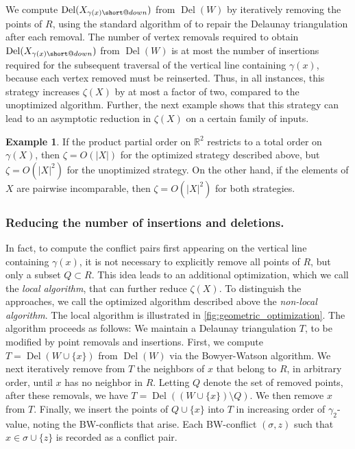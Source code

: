 \documentclass[11pt]{amsart}
\makeatletter
\newcommand{\R}{\mathbb{R}} %
\DeclareMathOperator{\DelT}{Del}
\newcommand{\deff}{\emph}
\DeclareRobustCommand{\subdown}{%
  \mathrel{\mathpalette\short@down\relax}%
}
\newcommand{\short@down}[2]{%
  \mkern2mu
  \clipbox{0 0 0 {.45\height}}{$\m@th#1\vphantom{+}{\downarrow}$}%
}
\renewcommand{\subparagraph}[1]{\subsubsection*{\textbf{\textup{#1}}}}
\theoremstyle{plain}
\theoremstyle{definition}
\newtheorem{example}[theorem]{Example}
\theoremstyle{remark}
\makeatother
\begin{document}
We compute $\DelT(X_{\gamma(x){\subdown}})$ from $\DelT(W)$ by iteratively removing the points of $R$, using the standard algorithm of \cite{Devillers1999} to repair the Delaunay triangulation after each removal.  
%
The number of vertex removals required to obtain $\DelT(X_{\gamma(x){\subdown}})$ from $\DelT(W)$ is at most the number of insertions required for the subsequent traversal of the vertical line containing $\gamma(x)$, because each vertex removed must be reinserted.  Thus, in all instances, this strategy increases $\zeta(X)$ by at most a factor of two, compared to the unoptimized algorithm.  Further, the next example shows that this strategy can lead to an asymptotic reduction in $\zeta(X)$ on a certain family of inputs.   
%
\begin{example}
If the product partial order on $\R^2$ restricts to a total order on $\gamma(X)$, then $\zeta=O(|X|)$ for the optimized strategy described above, but $\zeta=O(|X|^2)$ for the unoptimized strategy.  On the other hand, if the elements of $X$ are pairwise incomparable, then $\zeta=O(|X|^2)$ for both strategies.  
\end{example}
%
%
\subparagraph{Reducing the number of insertions and deletions.} 
In fact, to compute the conflict pairs first appearing on the vertical line containing $\gamma(x)$, it is not necessary to explicitly remove all points of $R$, but only a subset $Q\subset R$.  This idea leads to an additional optimization, which we call the \deff{local algorithm}, that can further reduce $\zeta(X)$.  To distinguish the approaches, we call the optimized algorithm described above the \deff{non-local algorithm}.
%
The local algorithm is illustrated in \cref{fig:geometric_optimization}.  The algorithm proceeds as follows:  We maintain a Delaunay triangulation $T$, to be modified by point removals and insertions.  First, we compute $T=\DelT(W\cup \{x\})$ from $\DelT(W)$ via the Bowyer-Watson algorithm.  We next iteratively remove from $T$ the neighbors of $x$ that belong to $R$, in arbitrary order, until $x$ has no neighbor in $R$.  Letting $Q$ denote the set of removed points, after these removals, we have $T=\DelT((W\cup\{x\})\setminus Q)$.  We then remove $x$ from $T$.  Finally, we insert the points of $Q\cup \{x\}$ into $T$ in increasing order of $\gamma_2$-value, noting the BW-conflicts that arise.  Each BW-conflict $(\sigma, z)$ such that $x\in \sigma\cup\{z\}$ is recorded as a conflict pair.  
\end{document}
